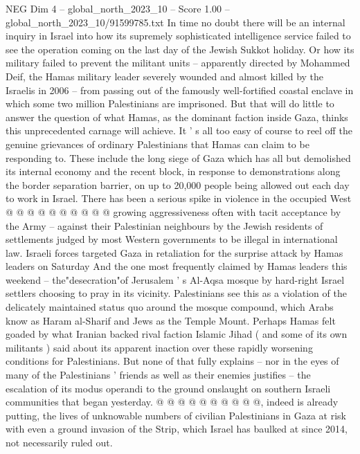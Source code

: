 \begin{textsample}{NEG Dim 4 – global\_north\_2023\_10 – Score 1.00 – global\_north\_2023\_10/91599785.txt}  \label{ex:f4_neg_001}
In time no doubt there will be an internal inquiry in Israel into how its supremely sophisticated intelligence service failed to see the operation coming on the last day of the Jewish Sukkot holiday.
Or how its military failed to prevent the militant units -- apparently directed by Mohammed Deif, the Hamas military leader severely wounded and almost killed by the Israelis in 2006 -- from passing out of the famously well-fortified coastal enclave in which some two million Palestinians are imprisoned.
But that will do little to answer the question of what Hamas, as the dominant faction inside Gaza, thinks this unprecedented carnage will achieve.
It ' s all too easy of course to reel off the genuine grievances of ordinary Palestinians that Hamas can claim to be responding to.
These include the long siege of Gaza which has all but demolished its internal economy and the recent block, in response to demonstrations along the border separation barrier, on up to 20,000 people being allowed out each day to work in Israel.
There has been a serious spike in violence in the occupied West @ @ @ @ @ @ @ @ @ @ growing aggressiveness often with tacit acceptance by the Army -- against their Palestinian neighbours by the Jewish residents of settlements judged by most Western governments to be illegal in international law.
Israeli forces targeted Gaza in retaliation for the surprise attack by Hamas leaders on Saturday And the one most frequently claimed by Hamas leaders this weekend -- the"desecration"of Jerusalem ' s Al-Aqsa mosque by hard-right Israel settlers choosing to pray in its vicinity.
Palestinians see this as a violation of the delicately maintained status quo around the mosque compound, which Arabs know as Haram al-Sharif and Jews as the Temple Mount.
Perhaps Hamas felt goaded by what Iranian backed rival faction Islamic Jihad ( and some of its own militants ) said about its apparent inaction over these rapidly worsening conditions for Palestinians.
But none of that fully explains -- nor in the eyes of many of the Palestinians ' friends as well as their enemies justifies -- the escalation of its modus operandi to the ground onslaught on southern Israeli communities that began yesterday. @ @ @ @ @ @ @ @ @ @, indeed is already putting, the lives of unknowable numbers of civilian Palestinians in Gaza at risk with even a ground invasion of the Strip, which Israel has baulked at since 2014, not necessarily ruled out.

\end{textsample}

